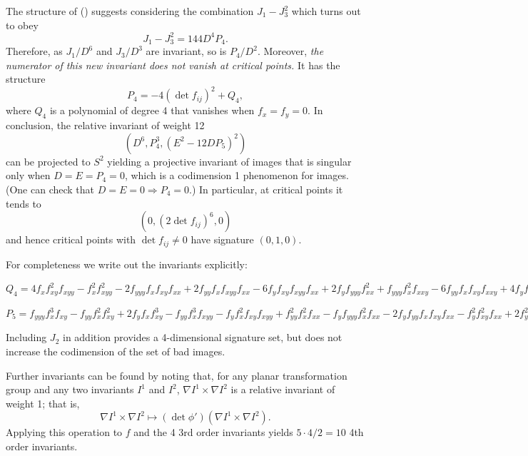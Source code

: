 \documentclass[review,onefignum,onetabnum]{siamonline190516}
\begin{document}
The structure of () suggests considering the combination $J_1 - J_3^2$ which turns out to obey
$$J_1 - J_3^2 = 144 D^4 P_4.$$
Therefore, as $J_1/D^6$ and $J_3/D^3$ are invariant, so is $P_4/D^2$. 
Moreover, {\em the numerator of this new invariant does not vanish at critical points.} 
It has the structure
$$P_4 = -4(\det f_{ij})^2 + Q_4,$$
where $Q_4$ is a polynomial of degree 4 that vanishes when $f_x=f_y=0$. In conclusion, the
relative invariant of weight 12
$$ (D^6, P_4^3, (E^2-12D P_5)^2)$$
can be projected to $S^2$ yielding a projective invariant of images that
is singular only when $D=E=P_4=0$, which is a codimension 1 phenomenon for images.
(One can check that $D=E=0\Rightarrow P_4=0$.) In particular, at critical points it tends to
$$ (0, (2\det f_{ij})^6, 0)$$
and hence critical points with $\det f_{ij}\ne 0$ have signature $(0,1,0)$.

For completeness we write out the invariants explicitly:

$Q_4=4 f_x  f_{xy} ^2 f_{xyy}  - 
f_x ^2 f_{xyy} ^2 - 
 2 f_{yyy}  f_x  f_{xy}  f_{xx}  + 
 2 f_{yy}  f_x  f_{xyy}  f_{xx}  - 
 6 f_{y}  f_{xy}  f_{xyy}  f_{xx}  + 
 2 f_{y}  f_{yyy}  f_{xx} ^2 + 
 f_{yyy}  f_x ^2 f_{xxy}  - 
 6 f_{yy}  f_x  f_{xy}  f_{xxy}  + 
 4 f_{y}  f_{xy} ^2 f_{xxy}  + 
 f_{y}  f_x  f_{xyy}  f_{xxy}  + 
 2 f_{y}  f_{yy}  f_{xx}  f_{xxy}  - 
 f_{y} ^2 f_{xxy} ^2 + 
 2 f_{yy} ^2 f_x  f_{xxx}  - 
 f_{y}  f_{yyy}  f_x  f_{xxx}  - 
 2 f_{y}  f_{yy}  f_{xy}  f_{xxx}  + f_{y} ^2 f_{xyy}  f_{xxx} $
 
$P_5=f_{yyy}  f_{x} ^3 f_{xy}  - 
f_{yy}  f_{x} ^2 f_{xy} ^2 + 
 2 f_{y}  f_{x}  f_{xy} ^3 - 
 f_{yy}  f_{x} ^3 f_{xyy}  - 
 f_{y}  f_{x} ^2 f_{xy}  f_{xyy}  + 
 f_{yy} ^2 f_{x} ^2 f_{xx}  - 
 f_{y}  f_{yyy}  f_{x} ^2 f_{xx}  - 
 2 f_{y}  f_{yy}  f_{x}  f_{xy}  f_{xx}  - 
 f_{y} ^2 f_{xy} ^2 f_{xx}  + 
 2 f_{y} ^2 f_{x}  f_{xyy}  f_{xx}  + 
 f_{y} ^2 f_{yy}  f_{xx} ^2 + 
 2 f_{y}  f_{yy}  f_{x} ^2 f_{xxy}  - 
 f_{y} ^2 f_{x}  f_{xy}  f_{xxy}  - 
 f_{y} ^3 f_{xx}  f_{xxy}  - 
 f_{y} ^2 f_{yy}  f_{x}  f_{xxx}  + 
 f_{y} ^3 f_{xy}  f_{xxx} $
 
Including $J_2$ in addition provides a 4-dimensional signature set, but does not increase the codimension of the set of bad images.
 
Further invariants can be found by noting that, for any planar transformation group and any two invariants
$I^1$ and $I^2$, $\nabla I^1 \times \nabla I^2$ is a relative invariant of weight 1; that is,
$$\nabla I^1 \times \nabla I^2\mapsto (\det \phi')(\nabla I^1 \times \nabla I^2).$$
Applying this operation to $f$ and the 4 3rd order invariants yields $5\cdot4/2=1$0  4th order invariants.
\end{document}
